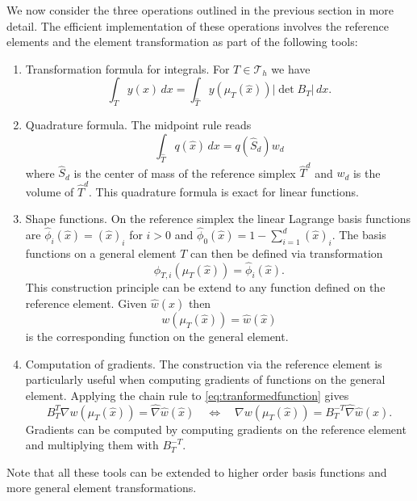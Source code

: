 \documentclass[a4paper,12pt]{article}
\begin{document}
We now consider the three operations outlined in the previous section
in more detail. The efficient implementation of these operations involves
the reference elements and the element transformation as part of the following
tools:
\begin{enumerate}[Tool 1)]
\item Transformation formula for integrals. For $T\in\mathcal{T}_h$ we have
\begin{equation*}
\int_T y(x)\,dx = \int_{\hat T} y(\mu_T(\hat x)) |\det B_T| \,dx .
\end{equation*}
\item Quadrature formula. The midpoint rule reads
\begin{equation*}
\int_{\hat T} q(\hat x) \,dx = q(\hat S_d) w_d
\end{equation*}
where $\hat S_d$ is the center of mass of the reference simplex $\hat T^d$
and $w_d$ is the volume of $\hat T^d$. This quadrature formula is exact for linear
functions.
\item Shape functions. On the reference simplex the linear Lagrange
basis functions are $\hat\phi_i(\hat x) = (\hat x)_i$ for $i>0$ and 
$\hat\phi_0(\hat x) = 1-\sum_{i=1}^d (\hat x)_i$. The basis functions
on a general element $T$ can then be defined via transformation
\begin{equation*}
\phi_{T,i}(\mu_T(\hat x)) = \hat\phi_i(\hat x) .
\end{equation*}
This construction principle can be extend to any function defined on the
reference element. Given $\hat w(\hat x)$ then 
\begin{equation}
w(\mu_T(\hat x))=\hat w(\hat x)
\label{eq:tranformedfunction}
\end{equation}
is the corresponding function on the general element.
\item Computation of gradients. The construction via the reference element
is particularly useful when computing gradients of functions on the general element.
Applying the chain rule to \eqref{eq:tranformedfunction} gives
\begin{equation*}
B_T^T \nabla w(\mu_T(\hat x)) = \hat\nabla \hat w(\hat x) \quad\Leftrightarrow\quad
\nabla w(\mu_T(\hat x)) = B_T^{-T}\hat\nabla \hat w(\hat x) .
\end{equation*}
Gradients can be computed by computing gradients on the reference element
and multiplying them with $B_T^{-T}$.
\end{enumerate}
Note that all these tools can be extended to higher order basis functions
and more general element transformations.
\end{document}
